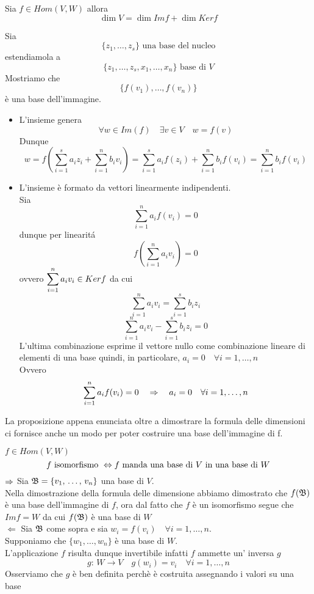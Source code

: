 \begin{prop}\bianco \label{dim_ker_imm}
Sia $f \in Hom(V,W) $ allora 
$$ \dim V=\dim Im f +\dim Ker f $$

\proof Sia 
$$ \{ z_1, \dots , z_s \} \text{ una base del nucleo} $$
estendiamola  a 
$$ \{ z_1, \dots, z_s, x_1, \dots, x_n \}\text{ base di } V $$
Mostriamo che 
$$ \{ f(v_1), \dots,f(v_n)\} $$
\`e una base dell'immagine.
\begin{itemize}
\item L'insieme genera
$$ \forall w\in Im (f) \quad \exists v \in V \quad w=f(v)$$ 
Dunque 
$$w= f \left( \sum_{i=1}^s  a_i z_i + \sum_{i=1}^n b_i v_i \right)=\sum_{i=1}^s a_i f(z_i) + \sum_{i=1}^n b_i f(v_i) = \sum_{i=1}^n b_i f(v_i) $$
\item L'insieme \`e formato da vettori linearmente indipendenti.\\
Sia 
$$  \sum_{ i=1}^n a_i f(v_i) = 0 $$
dunque per linearit\'a
$$ f\left(  \sum_{i=1}^n a_i v_i \right) =0 $$ ovvero 
$\displaystyle   \sum_{i=1}^n a_i v_i  \in Ker f$ da cui
 $$ \sum_{i=1}^n a_i v_i  = \sum_{i=1}^s b_i z_i $$
 $$  \sum_{i=1}^n a_i v_i  - \sum_{i=1}^s b_i z_i =0$$
L'ultima combinazione esprime il vettore nullo come combinazione lineare di elementi di una base quindi, in particolare, $ a_i= 0 \quad \forall i=1, \dots, n $\\
Ovvero
$$  \sum_{ i=1}^n a_i f(v_i) = 0 \quad \Rightarrow \quad  a_i= 0 \quad \forall i=1, \dots, n $$

\end{itemize}
\endproof
\end{prop}
\begin{oss} La proposizione appena enunciata oltre a dimostrare la formula delle dimensioni ci fornisce anche un modo per poter costruire una base dell'immagine di f.
\end{oss}
\spazio
\begin{cor}\label{iso_base_in_base}$f \in Hom(V,W)$
$$ f\text{ isomorfismo } \Leftrightarrow f \text{ manda una base di } V \text{ in una base di } W $$
\proof $\Rightarrow$ Sia $\mathfrak{B} =\{ v_1, \, \dots , \, v_n \} $ una base di $V$.\\
Nella dimostrazione della formula delle dimensione abbiamo dimostrato che $f(\mathfrak{B})$ \`e una base dell'immagine di $f$, ora dal fatto che $f$ \`e un isomorfismo segue che $Im f = W $ da cui $f(\mathfrak{B})$ \`e una base di $W$\\
$\Leftarrow$ 
Sia $\mathfrak{B}$ come sopra e sia $w_i = f(v_i ) \quad \forall i=1, \dots, n $.\\
Supponiamo che $\{ w_1, \dots, w_n \} $ \`e una base di $W$.\\
L'applicazione $f$ risulta dunque invertibile infatti $f$ ammette un' inversa $g$ 
$$ g:\, W \to V \quad g(w_i)=v_i \quad \forall i =1, \dots, n $$ 
Osserviamo che $g$ \`e ben definita perch\`e \`e costruita assegnando i valori su una base 
\endproof
\end{cor}
